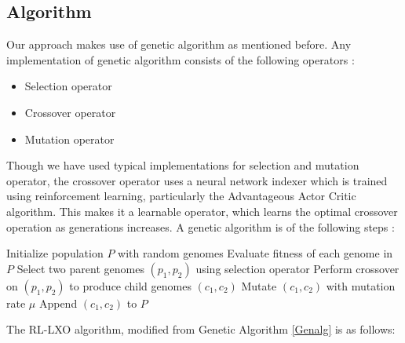 \documentclass{article}
\begin{document}
\subsection{Algorithm}
Our approach makes use of genetic algorithm as mentioned before. Any implementation of genetic algorithm consists of the following operators \citep{mathew2012genetic}:
\begin{itemize}
    \item Selection operator
    \item Crossover operator
    \item Mutation operator
\end{itemize}
Though we have used typical implementations for selection and mutation operator, the crossover operator uses a neural network indexer which is trained using reinforcement learning, particularly the Advantageous Actor Critic algorithm. This makes it a learnable operator, which learns the optimal crossover operation as generations increases. A genetic algorithm is of the following steps \citep{mathew2012genetic}:
\begin{algorithm}[H]
\caption{Genetic Algorithm}
\label{Genalg}
\begin{algorithmic}[1]
\State Initialize population $P$ with random genomes
    \State Evaluate fitness of each genome in $P$
    \State Select two parent genomes $(p_1, p_2)$ using selection operator
    \State Perform crossover on $(p_1, p_2)$ to produce child genomes $(c_1, c_2)$
    \State Mutate $(c_1, c_2)$ with mutation rate $\mu$
    \State Append $(c_1, c_2)$ to $P$
\EndFor
\end{algorithmic}
\end{algorithm}
The RL-LXO algorithm, modified from Genetic Algorithm \ref{Genalg} is as follows:
\end{document}
